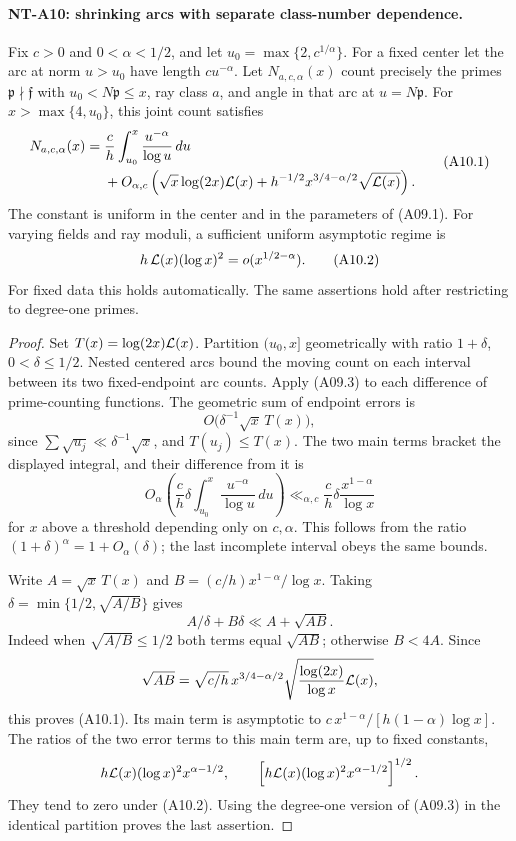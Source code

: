 \paragraph{NT-A10: shrinking arcs with separate class-number dependence.}
Fix \(c>0\) and \(0<\alpha<1/2\), and let
\(u_0=\max\{2,c^{1/\alpha}\}\).
For a fixed center let the arc at norm \(u>u_0\) have length
\(c u^{-\alpha}\). Let \(N_{a,c,\alpha}(x)\) count precisely
the primes \(\mathfrak p\nmid\mathfrak f\) with
\(u_0<N\mathfrak p\le x\), ray class \(a\), and angle in
that arc at \(u=N\mathfrak p\).
For \(x>\max\{4,u_0\}\), this joint count satisfies
\[
 \begin{split}
 N_{a,c,\alpha}(x)
  ={}&\frac c h\int_{u_0}^x\frac{u^{-\alpha}}{\log u}\,du\\
   &+O_{\alpha,c}\left(
       \sqrt x\log(2x){\cal L}(x)
       +h^{-1/2}x^{3/4-\alpha/2}\sqrt{{\cal L}(x)}
                  \right).                            
 \end{split} \tag{A10.1}
\]
The constant is uniform in the center and in the parameters
of (A09.1). For varying fields and ray moduli, a sufficient
uniform asymptotic regime is
\[
 h\,{\cal L}(x)(\log x)^2=o(x^{1/2-\alpha}).              \tag{A10.2}
\]
For fixed data this holds automatically. The same assertions
hold after restricting to degree-one primes.

\begin{proof}
Set \(T(x)=\log(2x){\cal L}(x)\). Partition \((u_0,x]\)
geometrically with ratio \(1+\delta\), \(0<\delta\le1/2\).
Nested centered arcs bound the moving count on each interval
between its two fixed-endpoint arc counts. Apply (A09.3) to
each difference of prime-counting functions. The geometric
sum of endpoint errors is
\[
 O\bigl(\delta^{-1}\sqrt x\,T(x)\bigr),
 \]
since \(\sum \sqrt{u_j}\ll\delta^{-1}\sqrt x\), and
\(T(u_j)\le T(x)\).
The two main terms bracket the displayed integral, and their
difference from it is
\[
 O_\alpha\left(\frac c h\delta
           \int_{u_0}^x\frac{u^{-\alpha}}{\log u}\,du\right)
 \ll_{\alpha,c}\frac c h\delta
                   \frac{x^{1-\alpha}}{\log x}
 \]
for \(x\) above a threshold depending only on \(c,\alpha\).
This follows from the ratio \((1+\delta)^\alpha=1+O_\alpha(\delta)\);
the last incomplete interval obeys the same bounds.

Write \(A=\sqrt x\,T(x)\) and
\(B=(c/h)x^{1-\alpha}/\log x\).
Taking \(\delta=\min\{1/2,\sqrt{A/B}\}\) gives
\[
 A/\delta+B\delta\ll A+\sqrt{AB}.
 \]
Indeed when \(\sqrt{A/B}\le1/2\) both terms equal \(\sqrt{AB}\);
otherwise \(B<4A\). Since
\[
 \sqrt{AB}
  =\sqrt{c/h}\,x^{3/4-\alpha/2}
       \sqrt{\frac{\log(2x)}{\log x}{\cal L}(x)},
 \]
this proves (A10.1). Its main term is asymptotic to
\(c\,x^{1-\alpha}/[h(1-\alpha)\log x]\).
The ratios of the two error terms to this main term are,
up to fixed constants,
\[
 h{\cal L}(x)(\log x)^2x^{\alpha-1/2},
 \qquad
 \left[h{\cal L}(x)(\log x)^2x^{\alpha-1/2}\right]^{1/2}.
 \]
They tend to zero under (A10.2).
Using the degree-one version of (A09.3) in the identical
partition proves the last assertion.
\end{proof}

